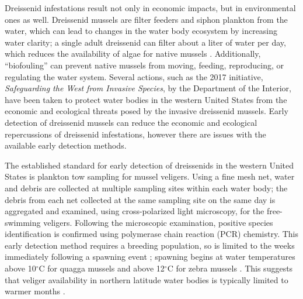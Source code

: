 \documentclass[12pt]{article}\usepackage[]{graphicx}\usepackage[]{color}
\begin{document}
Dreissenid infestations result not only in economic impacts, but in environmental ones as well. Dreissenid mussels are filter feeders and siphon plankton from the water, which can lead to changes in the water body ecosystem by increasing water clarity; a single adult dreissenid can filter about a liter of water per day, which reduces the availability of algae for native mussels \cite{BOR}. Additionally, ``biofouling'' can prevent native mussels from moving, feeding, reproducing, or regulating the water system. Several actions, such as the 2017 initiative, \textit{Safeguarding the West from Invasive Species}, by the Department of the Interior, have been taken to protect water bodies in the western United States from the economic and ecological threats posed by the invasive dreissenid mussels. Early detection of dreissenid mussels can reduce the economic and ecological repercussions of dreissenid infestations, however there are issues with the available early detection methods. 

The established standard for early detection of dreissenids in the western United States is plankton tow sampling for mussel veligers. Using a fine mesh net, water and debris are collected at multiple sampling sites within each water body; the debris from each net collected at the same sampling site on the same day is aggregated and examined, using cross-polarized light microscopy, for the free-swimming veligers. Following the microscopic examination, positive species identification is confirmed using polymerase chain reaction (PCR) chemistry. This early detection method requires a breeding population, so is limited to the weeks immediately following a spawning event \cite{Nichols}; spawning begins at water temperatures above 10$^\circ$C for quagga mussels and above 12$^\circ$C for zebra mussels \cite{McMahon, Mills}. This suggests that veliger availability in northern latitude water bodies is typically limited to warmer months \cite{Sepulveda:eDNA}.
\end{document}
